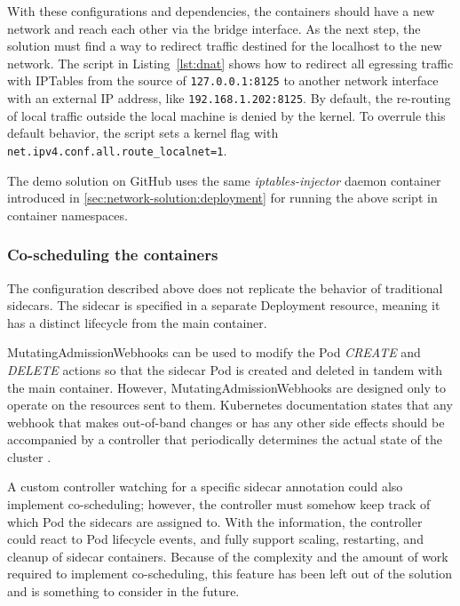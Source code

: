 \documentclass[english, 12pt, a4paper, sci, utf8, a-2b, online]{aaltothesis}
\begin{document}

With these configurations and dependencies, the containers should have a new network and reach each other via the bridge interface.
As the next step, the solution must find a way to redirect traffic destined for the localhost to the new network.
The script in Listing~\ref{lst:dnat} shows how to redirect all egressing traffic with IPTables from the source of \lstinline{127.0.0.1:8125} to another network interface with an external IP address, like \lstinline{192.168.1.202:8125}.
By default, the re-routing of local traffic outside the local machine is denied by the kernel.
To overrule this default behavior, the script sets a kernel flag with \lstinline{net.ipv4.conf.all.route_localnet=1}.



The demo solution on GitHub uses the same \emph{iptables-injector} daemon container introduced in \ref{sec:network-solution:deployment} for running the above script in container namespaces.

\subsubsection{Co-scheduling the containers}

The configuration described above does not replicate the behavior of traditional sidecars.
The sidecar is specified in a separate Deployment resource, meaning it has a distinct lifecycle from the main container.

MutatingAdmissionWebhooks can be used to modify the Pod \emph{CREATE} and \emph{DELETE} actions so that the sidecar Pod is created and deleted in tandem with the main container.
However, MutatingAdmissionWebhooks are designed only to operate on the resources sent to them.
Kubernetes documentation states that any webhook that makes out-of-band changes or has any other side effects should be accompanied by a controller that periodically determines the actual state of the cluster \cite{k8s-docs-dac}.

A custom controller watching for a specific sidecar annotation could also implement co-scheduling; however, the controller must somehow keep track of which Pod the sidecars are assigned to.
With the information, the controller could react to Pod lifecycle events, and fully support scaling, restarting, and cleanup of sidecar containers.
Because of the complexity and the amount of work required to implement co-scheduling, this feature has been left out of the solution and is something to consider in the future.
\end{document}
